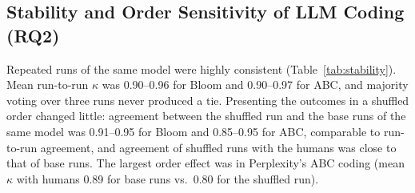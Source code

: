 \documentclass[journal,article,submit,pdftex,moreauthors]{Definitions/mdpi}
\begin{document}
\begin{table}[H]
\caption{Krippendorff's $\alpha$ for sets of coders, with 95\% bootstrap confidence intervals.}
\label{tab:alpha}
\centering
\footnotesize
\setlength{\tabcolsep}{3pt}
\end{table}

\subsection{Stability and Order Sensitivity of LLM Coding (RQ2)}
\label{sec:res_stability}

Repeated runs of the same model were highly consistent (Table~\ref{tab:stability}). Mean run-to-run $\kappa$ was 0.90--0.96 for Bloom and 0.90--0.97 for ABC, and majority voting over three runs never produced a tie. Presenting the outcomes in a shuffled order changed little: agreement between the shuffled run and the base runs of the same model was 0.91--0.95 for Bloom and 0.85--0.95 for ABC, comparable to run-to-run agreement, and agreement of shuffled runs with the humans was close to that of base runs. The largest order effect was in Perplexity's ABC coding (mean $\kappa$ with humans 0.89 for base runs vs.\ 0.80 for the shuffled run).
\end{document}
